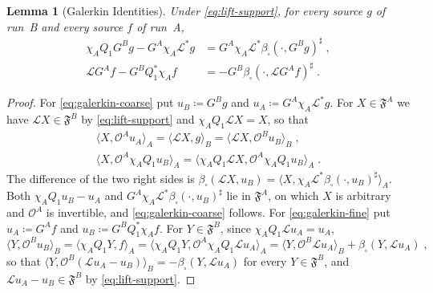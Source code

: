 \documentclass[11pt]{preprint}
\numberwithin{equation}{section}
\newtheorem{lemma}[theorem]{Lemma}
\theoremstyle{definition}
\theoremstyle{remark}
\theoremstyle{plain}
\begin{document}
\begin{lemma}[Galerkin Identities]\label{lem:galerkin}
Under \eqref{eq:lift-support}, for every source $g$ of run~B and every source $f$ of run~A,
\begin{align}
    \chi_AQ_1G^Bg - G^A\chi_A\mathcal L^*g &= G^A\chi_A\mathcal L^*\beta_\square(\cdot, G^Bg)^\sharp\;, \label{eq:galerkin-coarse}\\
    \mathcal LG^Af - G^BQ_1^*\chi_Af &= -G^B\beta_\square(\cdot, \mathcal LG^Af)^\sharp\;. \label{eq:galerkin-fine}
\end{align}
\end{lemma}

\begin{proof}
For \eqref{eq:galerkin-coarse} put $u_B \coloneqq G^Bg$ and $u_A \coloneqq G^A\chi_A\mathcal L^*g$. For $X \in \mathfrak F^A$ we have $\mathcal LX \in \mathfrak F^B$ by \eqref{eq:lift-support} and $\chi_AQ_1\mathcal LX = X$, so that
\begin{equation}\label{eq:galerkin-coarse-proof}
\begin{gathered}
    \langle X, \mathcal O^Au_A\rangle_A = \langle\mathcal LX, g\rangle_B = \langle\mathcal LX, \mathcal O^Bu_B\rangle_B\;,\\
    \langle X, \mathcal O^A\chi_AQ_1u_B\rangle_A = \langle\chi_AQ_1\mathcal LX, \mathcal O^A\chi_AQ_1u_B\rangle_A\;.
\end{gathered}
\end{equation}
The difference of the two right sides is $\beta_\square(\mathcal LX, u_B) = \langle X, \chi_A\mathcal L^*\beta_\square(\cdot, u_B)^\sharp\rangle_A$. Both $\chi_AQ_1u_B - u_A$ and $G^A\chi_A\mathcal L^*\beta_\square(\cdot, u_B)^\sharp$ lie in $\mathfrak F^A$, on which $X$ is arbitrary and $\mathcal O^A$ is invertible, and \eqref{eq:galerkin-coarse} follows. For \eqref{eq:galerkin-fine} put $u_A \coloneqq G^Af$ and $u_B \coloneqq G^BQ_1^*\chi_Af$. For $Y \in \mathfrak F^B$, since $\chi_AQ_1\mathcal Lu_A = u_A$,
\begin{equation}\label{eq:galerkin-fine-proof}
    \langle Y, \mathcal O^Bu_B\rangle_B = \langle\chi_AQ_1Y, f\rangle_A = \langle\chi_AQ_1Y, \mathcal O^A\chi_AQ_1\mathcal Lu_A\rangle_A = \langle Y, \mathcal O^B\mathcal Lu_A\rangle_B + \beta_\square(Y, \mathcal Lu_A)\;,
\end{equation}
so that $\langle Y, \mathcal O^B(\mathcal Lu_A - u_B)\rangle_B = -\beta_\square(Y, \mathcal Lu_A)$ for every $Y \in \mathfrak F^B$, and $\mathcal Lu_A - u_B \in \mathfrak F^B$ by \eqref{eq:lift-support}.
\end{proof}
\end{document}
